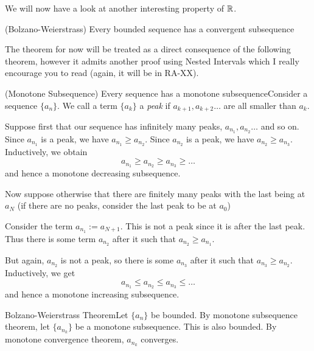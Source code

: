 \newpage
We will now have a look at another interesting property of $\mathbb{R}$.
\begin{SNP}{\thm}{(Bolzano-Weierstrass) Every bounded sequence has a convergent subsequence}
\end{SNP}
The theorem for now will be treated as a direct consequence of the following theorem, however it admits another proof using Nested Intervals which I really encourage you to read (again, it will be in RA-XX).
\begin{SWP}{\thm}{(Monotone Subsequence) Every sequence has a monotone subsequence}Consider a sequence $\{a_n\}$. We call a term $\{a_k\}$ a \emph{peak} if $a_{k + 1}, a_{k + 2} \dots$ are all smaller than $a_k$.

Suppose first that our sequence has infinitely many peaks, $a_{n_1}, a_{n_2} \dots$ and so on. Since $a_{n_1}$ is a peak, we have $a_{n_1} \geq a_{n_2}$. Since $a_{n_2}$ is a peak, we have $a_{n_2} \geq a_{n_3}$. Inductively, we obtain
$$
a_{n_1} \geq a_{n_2} \geq a_{n_3} \geq \dots
$$
and hence a monotone decreasing subsequence.

Now suppose otherwise that there are finitely many peaks with the last being at $a_N$ (if there are no peaks, consider the last peak to be at $a_0$)

Consider the term $a_{n_1} := a_{N+1}$. This is not a peak since it is after the last peak. Thus there is some term $a_{n_2}$ after it such that $a_{n_2} \geq a_{n_1}$.

But again, $a_{n_2}$ is not a peak, so there is some $a_{n_3}$ after it such that $a_{n_3} \geq a_{n_2}$. Inductively, we get
$$
a_{n_1} \leq a_{n_2} \leq a_{n_3} \leq \dots
$$
and hence a monotone increasing subsequence.
\end{SWP}
\begin{SWP}{\crl}{Bolzano-Weierstrass Theorem}Let $\{a_n\}$ be bounded. By monotone subsequence theorem, let $\{a_{n_k}\}$ be a monotone subsequence. This is also bounded. By monotone convergence theorem, $a_{n_k}$ converges.
\end{SWP}
